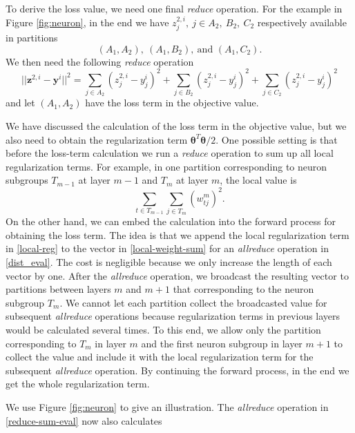 \documentclass[12pt]{article}
\def\by{{\boldsymbol y}}
\def\bz{{\boldsymbol z}}
\def\btheta{\boldsymbol \theta}
\begin{document}
\par To derive the loss value, we need one final {\it reduce} operation. For the example in Figure \ref{fig:neuron}, 
in the end we have $z^{2,i}_j,\ j \in A_2,\ B_2,\ C_2$ respectively available in partitions 
\begin{equation*}
(A_1,A_2),\ (A_1,B_2),\ \text{and } (A_1,C_2).
\end{equation*}
We then need the following {\it reduce} operation
\begin{equation}
\label{distri-loss-sum}
||\bz^{2,i} - \by^{i}||^2 = \sum_{j \in A_2} (z^{2,i}_j - y^i_j)^2 + \sum_{j \in B_2} (z^{2,i}_j - y^i_j)^2 + \sum_{j \in C_2} (z^{2,i}_j - y^i_j)^2
\end{equation}
and let $(A_1,A_2)$ have the loss term in the objective value.
\par We have discussed the calculation of the loss term in the objective value, but we also need to obtain the regularization term $\btheta^T \btheta/2$. 
One possible setting is that before the loss-term calculation we run a {\it reduce} operation to sum up all local regularization terms.
For example, in one partition corresponding to neuron subgroups $T_{m-1}$ at layer $m-1$ and $T_m$ at layer $m$, the local value is
\begin{equation}
\label{local-reg}
\sum_{t \in T_{m-1}} \sum_{j \in T_m} (w^{m}_{tj})^2.
\end{equation}
On the other hand, we can embed the calculation into the forward process for obtaining the loss term. The idea is that we append the local regularization term in \eqref{local-reg}
to the vector in \eqref{local-weight-sum} for an {\it allreduce} operation in \eqref{dist_eval}. The cost is negligible because we only increase the length
of each vector by one. After the {\it allreduce} operation, we broadcast the resulting vector to partitions between layers $m$ and $m+1$ that corresponding to the neuron subgroup $T_m$.
We cannot let each partition collect the broadcasted value for subsequent {\it allreduce} operations because regularization terms in previous layers would be calculated several times.
To this end, we allow only the partition corresponding to $T_{m}$ in layer $m$ and the first neuron subgroup in layer $m+1$ to collect the value and include it with the local regularization term
for the subsequent {\it allreduce} operation. By continuing the forward process, in the end we get the whole regularization term.
\par We use Figure \ref{fig:neuron} to give an illustration. The {\it allreduce} operation in \eqref{reduce-sum-eval} now also calculates 
\end{document}
